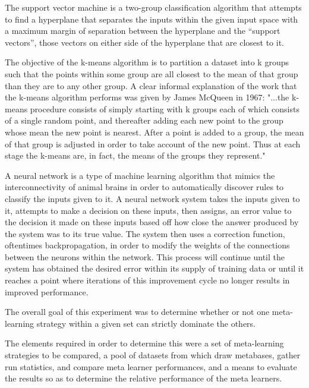 \documentclass{article}
\begin{document}
The support vector machine is a two-group classification algorithm that attempts
to find a hyperplane that separates the inputs within the given input space
with a maximum margin of separation between the hyperplane and the
``support vectors'', those vectors on either side of the hyperplane that are
closest to it.

The objective of the k-means algorithm is to partition a dataset into k groups
such that the points within some group are all closest to
the mean of that group than they are to any other group. A clear
informal explanation of the work that the k-means algorithm performs
was given by James McQueen in 1967: "...the k-means procedure
consists of simply starting with k groups each of which consists of a
single random point, and thereafter adding each new point to the
group whose mean the new point is nearest. After a point is added to
a group, the mean of that group is adjusted in order to take account
of the new point. Thus at each stage the k-means are, in fact, the
means of the groups they represent."

A neural network is a type of machine learning algorithm that mimics
the interconnectivity of animal brains in order to automatically
discover rules to classify the inputs given to it. A neural network system
takes the inputs given to it, attempts to make a decision on these inputs,
then assigns, an error value to the decision it made on these inputs based off
how close the answer produced by the system was to its true value. The system
then uses a correction function, oftentimes backpropagation, in order to modify
the weights of the connections between the neurons within the network. This
process will continue until the system has obtained the desired error within its
supply of training data or until it reaches a point where iterations of this
improvement cycle no longer results in improved performance.

The overall goal of this experiment was to determine whether or not one
meta-learning strategy within a given set can strictly dominate the others.

The elements required in order to determine this were a set of meta-learning
strategies to be compared, a pool of datasets from which draw metabases, gather
run statistics, and compare meta learner performances, and a means to evaluate
the results so as to determine the relative performance of the meta learners.
\end{document}

